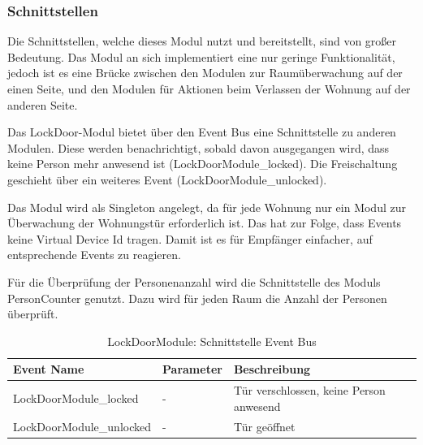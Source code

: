 \subsubsection{Schnittstellen}
Die Schnittstellen, welche dieses Modul nutzt und bereitstellt, sind von großer Bedeutung. Das Modul an sich implementiert eine nur geringe Funktionalität, jedoch ist es eine Brücke zwischen den Modulen zur Raumüberwachung auf der einen Seite, und den Modulen für Aktionen beim Verlassen der Wohnung auf der anderen Seite.

Das LockDoor-Modul bietet über den Event Bus eine Schnittstelle zu anderen Modulen. Diese werden benachrichtigt, sobald davon ausgegangen wird, dass keine Person mehr anwesend ist (LockDoorModule\_locked). Die Freischaltung geschieht über ein weiteres Event (LockDoorModule\_unlocked).

Das Modul wird als Singleton angelegt, da für jede Wohnung nur ein Modul zur Überwachung der Wohnungstür erforderlich ist. Das hat zur Folge, dass Events keine Virtual Device Id tragen. Damit ist es für Empfänger einfacher, auf entsprechende Events zu reagieren.

Für die Überprüfung der Personenanzahl wird die Schnittstelle des Moduls PersonCounter genutzt. Dazu wird für jeden Raum die Anzahl der Personen überprüft.



\begin{table}[h!]
\begin{tabularx}{\textwidth}{
		 >{\hsize=1.25\hsize}X %
		>{\hsize=0.5\hsize\centering}X %
		>{\hsize=1.25\hsize}X %
	}
	\hline
	\textbf{Event Name}					& \textbf{Parameter}	& \textbf{Beschreibung} \\
	\hline LockDoorModule\_locked		& - 					& Tür verschlossen, keine Person anwesend \\ 
	\hline LockDoorModule\_unlocked		& - 			 		& Tür geöffnet \\ 
	\hline
\end{tabularx}
\caption{LockDoorModule: Schnittstelle Event Bus}
\end{table}


